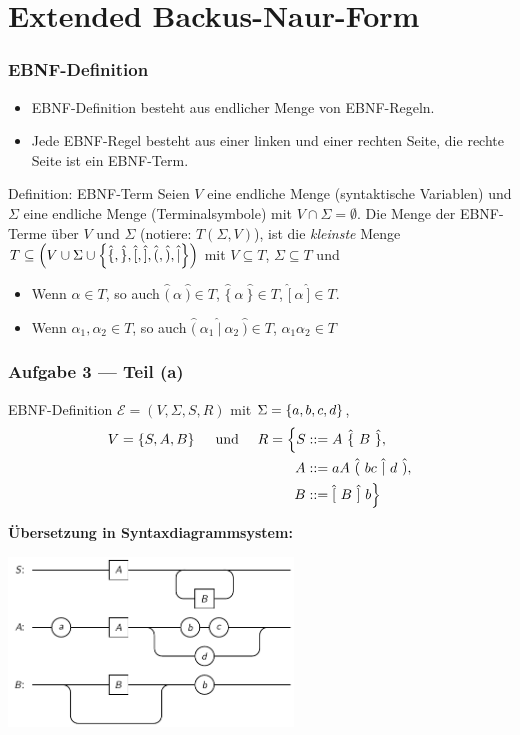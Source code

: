 \documentclass{beamer}
\newcommand{\wdh}[1]{\hat{\{} \ #1 \ \hat{\}}}
\newcommand{\opt}[2]{\hat{(} \ #1 \ \hat{|} \ #2 \ \hat{)}}
\newcommand{\byp}[1]{\hat{[} \ #1 \ \hat{]}}
\newcommand{\rdb}[1]{\hat{(} \ #1 \ \hat{)}}
\begin{document}
\section{Extended Backus-Naur-Form}

\begin{frame} \frametitle{EBNF-Definition}
	\small
	\begin{itemize}
		\item EBNF-Definition besteht aus endlicher Menge von EBNF-Regeln.
		\item Jede EBNF-Regel besteht aus einer linken und einer rechten Seite, die rechte Seite ist ein EBNF-Term.
	\end{itemize}
	\pause
	\begin{block}{Definition: EBNF-Term}
		Seien $V$ eine endliche Menge (syntaktische Variablen) und $\Sigma$ eine endliche Menge (Terminalsymbole) mit $V \cap \Sigma = \emptyset$. Die Menge der EBNF-Terme über $V$ und $\Sigma$ (notiere: $T(\Sigma, V)$), ist die \emph{kleinste} Menge $T \subseteq \left( V \cup \Sigma \cup \left\{ \hat{\{}, \hat{\}}, \hat{[}, \hat{]}, \hat{(}, \hat{)}, \hat{|} \right\} \right)$ mit $V \subseteq T$, $\Sigma \subseteq T$ und
		\begin{itemize}
			\item Wenn $\alpha \in T$, so auch $\rdb{\alpha} \in T$, $\wdh{\alpha} \in T$, $\byp{\alpha} \in T$.
			\item Wenn $\alpha_1, \alpha_2 \in T$, so auch $\opt{\alpha_1}{\alpha_2} \in T$, $\alpha_1 \alpha_2 \in T$
		\end{itemize}
	\end{block}
\end{frame}

\begin{frame} \frametitle{Aufgabe 3 --- Teil (a)}
	\small
	EBNF-Definition $\mathcal{E} = (V,\Sigma,S,R)$ mit $\Sigma = \left\{ a,b,c,d \right\}$,
	\begin{align*}
		V = \menge{S,A,B} 
		\quad \und \quad
		R = \Big\{ S &::= A \ \wdh{B} , \\ 
				   A &::= aA \  \opt{bc}{d} , \\
				   B &::= \byp{B} \ b 
		    \Big\}
	\end{align*}

	\pause
	
	\textbf{Übersetzung in Syntaxdiagrammsystem:}
	
	\centering
	\includegraphics[height=4.5cm]{tut02_syntax-dia-3a.pdf}
\end{frame}
\end{document}
